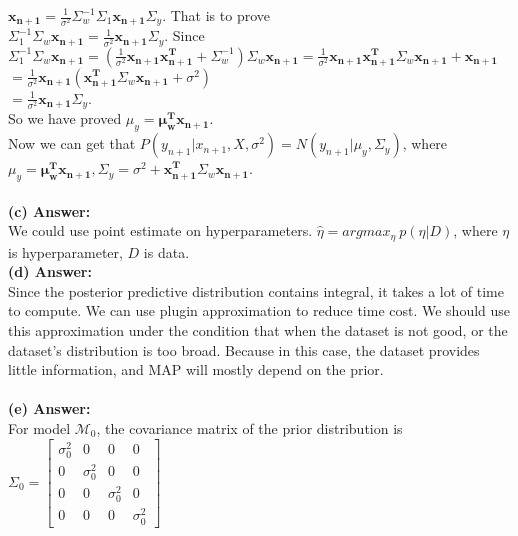 \documentclass{article}
\begin{document}
 $\mathbf{x_{n+1}} = \frac{1}{\sigma^2} \Sigma_w^{-1} \Sigma_1 \mathbf{x_{n+1}} \Sigma_y$. That is to prove\\
 $\Sigma_1^{-1} \Sigma_w \mathbf{x_{n+1}} = \frac{1}{\sigma^2} \mathbf{x_{n+1}} \Sigma_y$. Since\\
 $\Sigma_1^{-1} \Sigma_w \mathbf{x_{n+1}} = (\frac{1}{\sigma^2}\mathbf{x_{n+1}x_{n+1}^T} + \Sigma_{w}^{-1}) \Sigma_w \mathbf{x_{n+1}} = \frac{1}{\sigma^2}\mathbf{x_{n+1}x_{n+1}^T} \Sigma_w \mathbf{x_{n+1}} +\mathbf{x_{n+1}}  $\\
$= \frac{1}{\sigma^2}\mathbf{x_{n+1}} (\mathbf{x_{n+1}^T} \Sigma_w \mathbf{x_{n+1}} + \sigma^2)$\\
$= \frac{1}{\sigma^2} \mathbf{x_{n+1}} \Sigma_y$.\\
So we have proved $\mu_y = \mathbf{\mu_w^T x_{n+1}}$.\\
Now we can get that $P(y_{n+1}|x_{n+1},X,\sigma^2) = N(y_{n+1}|\mu_y, \Sigma_y)$, where\\
$\mu_y = \mathbf{\mu_w^T x_{n+1}},\Sigma_y = \sigma^2 +\mathbf{x_{n+1}^T} \Sigma_w \mathbf{x_{n+1}}$.\\
\\

\noindent
\textbf{(c) Answer:}\\
We could use point estimate on hyperparameters. 
$\hat{\eta} = argmax_{\eta}~ p(\eta | D)$, where $\eta$ is hyperparameter, $D$ is data.\\

\noindent
\textbf{(d) Answer:}\\
Since the posterior predictive distribution contains integral, it takes a lot of time to compute. We can use plugin approximation to reduce time cost. 
We should use this approximation under the condition that when the dataset is not good, or the dataset's distribution is too broad. Because in this case, the dataset provides little information, and MAP will mostly depend on the prior.\\
\\

\noindent
\textbf{(e) Answer:}\\
For model $\mathcal{M}_0$, the covariance matrix of the prior distribution is 
$\Sigma_0 =
\begin{bmatrix}
 \sigma_0^2 & 0 & 0 & 0\\ 
 0 & \sigma_0^2 & 0 & 0\\ 
 0 & 0 & \sigma_0^2 & 0\\ 
 0 & 0 & 0 & \sigma_0^2
\end{bmatrix}$\\ 
\end{document}

